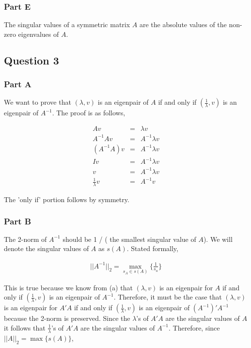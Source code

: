

\subsubsection{Part E}

The singular values of a symmetric matrix \(A\) are the absolute values of the non-zero eigenvalues of \(A\).

\newpage
\subsection{Question 3}
\subsubsection{Part A}

We want to prove that \((\lambda,v)\) is an eigenpair of \(A\) if and only if \((\frac{1}{\lambda},v)\) is an eigenpair of \(A^{-1}\).
The proof is as follows,

\begin{eqnarray}
  Av &=& \lambda v \\
  A^{-1}Av &=& A^{-1}\lambda v \\
  (A^{-1}A)v &=& A^{-1}\lambda v \\
  Iv &=& A^{-1}\lambda v \\
  v &=& A^{-1}\lambda v \\
  \frac{1}{\lambda}v &=& A^{-1}v
\end{eqnarray}

The 'only if' portion follows by symmetry.

\subsubsection{Part B}

The 2-norm of \(A^{-1}\) should be 1 / ( the smallest singular value of \(A\)).
We will denote the singular values of \(A\) as \(s(A)\).
Stated formally,

\begin{eqnarray}
  ||A^{-1}||_2 = \max_{s_A \in s(A)} \{\frac{1}{s_a}\}
\end{eqnarray}

This is true because we know from (a) that \((\lambda,v)\) is an eigenpair for \(A\) if and only if \((\frac{1}{\lambda},v)\) is an eigenpair of \(A^{-1}\).
Therefore, it must be the case that \((\lambda,v)\) is an eigenpair for \(A'A\) if and only if \((\frac{1}{\lambda},v)\) is an eigenpair of \(({A^{-1}})'A^{-1}\) because the 2-norm is preserved.
Since the \(\lambda\)'s of \(A'A\) are the singular values of \(A\) it follows that \(\frac{1}{\lambda}\)'s of \(A'A\) are the singular values of \(A^{-1}\).
Therefore, since \(||A||_2 = \max \{s(A)\}\),

